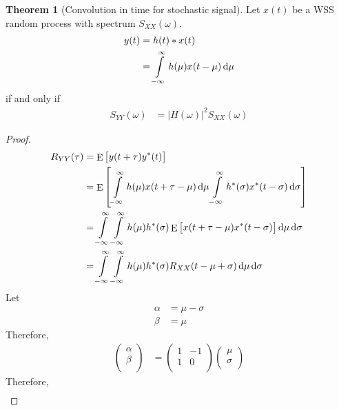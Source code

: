 \documentclass[titlepage, fleqn, a4paper, 12pt, twoside]{article}
\theoremstyle{definition}
\theoremstyle{theorem}
\newtheorem{theorem}{Theorem}
\DeclareMathOperator{\expct}{\mathrm{E}}
\begin{document}
\begin{theorem}[Convolution in time for stochastic signal]
	Let $x(t)$ be a WSS random process with spectrum $S_{X X}(\omega)$.\\
	\begin{align*}
		y(t) &= h(t) \ast x(t)\\
		&= \int\limits_{-\infty}^{\infty} h(\mu) x(t - \mu) \dif \mu
	\end{align*}
	if and only if
	\begin{align*}
		S_{Y Y}(\omega) &= \left| H(\omega) \right|^2 S_{X X}(\omega)
	\end{align*}
	\label{thm:convolution_in_time_for_stochastic_signal}
\end{theorem}

\begin{proof}
	\begin{align*}
		R_{Y Y}(\tau) &= \expct\left[ y(t + \tau) y^*(t) \right]\\
		&= \expct\left[ \int\limits_{-\infty}^{\infty} h(\mu) x(t + \tau - \mu) \dif \mu \int\limits_{-\infty}^{\infty} h^*(\sigma) x^*(t - \sigma) \dif \sigma \right]\\
		&= \int\limits_{-\infty}^{\infty} \int\limits_{-\infty}^{\infty} h(\mu) h^*(\sigma) \expct\left[ x(t + \tau - \mu) x^*(t - \sigma) \right] \dif \mu \dif \sigma\\
		&= \int\limits_{-\infty}^{\infty} \int\limits_{-\infty}^{\infty} h(\mu) h^*(\sigma) R_{X X}(t - \mu + \sigma) \dif \mu \dif \sigma
	\end{align*}
	Let
	\begin{align*}
		\alpha &= \mu - \sigma\\
		\beta &= \mu
	\end{align*}
	Therefore,
	\begin{align*}
			\begin{pmatrix}
				\alpha\\
				\beta\\
			\end{pmatrix}
		&=
			\begin{pmatrix}
				1 & -1\\
				1 & 0\\
			\end{pmatrix}
			\begin{pmatrix}
				\mu\\
				\sigma\\
			\end{pmatrix}
	\end{align*}
	Therefore,
	\begin{align*}

\end{align*}
\end{proof}
\end{document}

